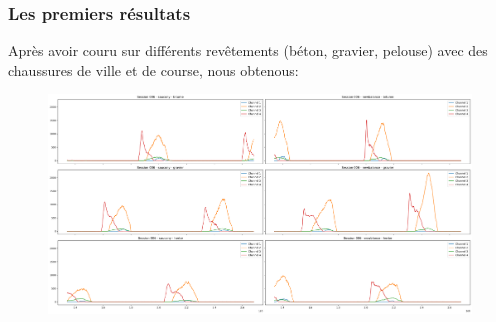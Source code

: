 \begin{frame}
    \frametitle{Les premiers résultats}
    Après avoir couru sur différents revêtements (béton, gravier, pelouse) avec des chaussures de ville et de course, nous obtenous:
    \begin{figure}
        \includegraphics[scale=0.20]{./figures/res_01.png}
        \centering
    \end{figure}
\end{frame}
